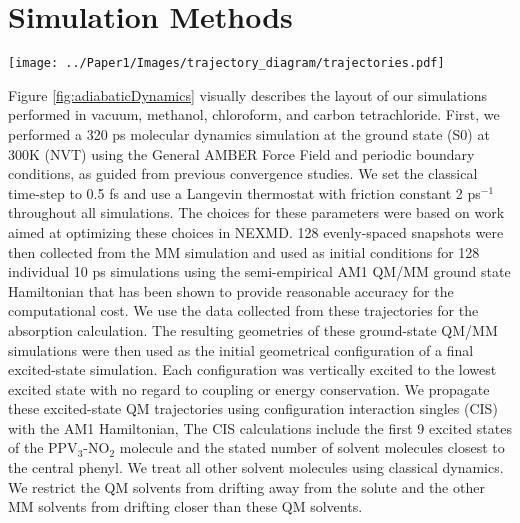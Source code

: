\section{Simulation Methods}

\noindent
\begin{minipage}[c]{\textwidth}
  \centering
  \texttt{[image: ../Paper1/Images/trajectory\_diagram/trajectories.pdf]}
  \label{fig:adiabaticDynamics}
\end{minipage}\bigskip

Figure \ref{fig:adiabaticDynamics} visually describes the layout of our simulations performed in vacuum, methanol, chloroform, and carbon tetrachloride.
   First, we performed a 320 ps molecular dynamics simulation at the ground state (S0) at 300K (NVT) using the General AMBER Force Field and periodic boundary conditions, as guided from previous convergence studies. \cite{silva2010benchmark}
We set the classical time-step to 0.5 fs and use a Langevin thermostat with friction constant 2 ps\(^{-1}\) throughout all simulations. The choices for these parameters were based on work aimed at optimizing these choices in NEXMD. \cite{nelson2012nonadiabatic}
   128 evenly-spaced snapshots were then collected from the MM simulation and used as initial conditions for 128 individual 10 ps simulations using the semi-empirical AM1 QM/MM ground state Hamiltonian that has been shown to provide reasonable accuracy for the computational cost. \cite{silva2010benchmark} We use the data collected from these trajectories for the absorption calculation.
   The resulting geometries of these ground-state QM/MM simulations were then used as the initial geometrical configuration of a final excited-state simulation. Each configuration was vertically excited to the lowest excited state with no regard to coupling or energy conservation. We propagate these excited-state QM trajectories using configuration interaction singles (CIS) with the AM1 Hamiltonian, 
   The CIS calculations include the first 9 excited states of the PPV\(_3\)-NO\(_2\) molecule and the stated number of solvent molecules closest to the central phenyl.
   We treat all other solvent molecules using classical dynamics.
   We restrict the QM solvents from drifting away from the solute and the other MM solvents from drifting closer than these QM solvents.

\noindent
	  \begin{multiFigure} 
	    \label{fig:PPV3NO2}
	  \end{multiFigure}
\bigskip

